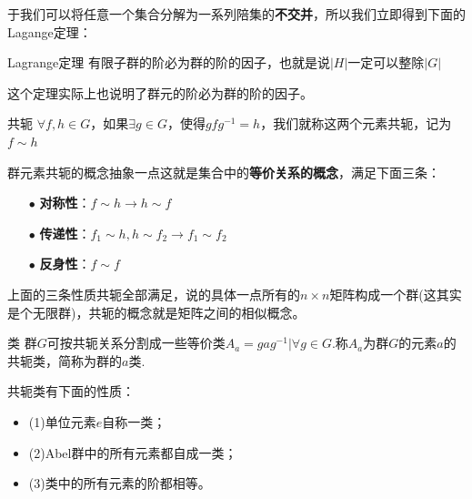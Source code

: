 于我们可以将任意一个集合分解为一系列陪集的\textbf{不交并}，所以我们立即得到下面的Lagange定理：
\begin{theorem}{Lagrange定理}
    有限子群的阶必为群的阶的因子，也就是说$|H|$一定可以整除$|G|$
\end{theorem}
这个定理实际上也说明了群元的阶必为群的阶的因子。
\begin{define}{共轭}
    $\forall f,h\in G$，如果$\exists g\in G$，使得$gfg^{-1}=h$，我们就称这两个元素共轭，记为$f\sim h$
\end{define}
群元素共轭的概念抽象一点这就是集合中的\textbf{等价关系的概念}，满足下面三条：
\begin{itemize}
    \item[$\bullet$] \textbf{对称性}：$f\sim h\rightarrow h\sim f$
    \item[$\bullet$] \textbf{传递性}：$f_1\sim h,h\sim f_2\rightarrow f_1\sim f_2$
    \item[$\bullet$] \textbf{反身性}：$f\sim f$
\end{itemize}
上面的三条性质共轭全部满足，说的具体一点所有的$n\times n$矩阵构成一个群(这其实是个无限群)，共轭的概念就是矩阵之间的相似概念。
\begin{define}{类}
    群$G$可按共轭关系分割成一些等价类$A_a={gag^{-1}|\forall g\in G}$.称$A_a$为群$G$的元素$a$的共轭类，简称为群的$a$类.
\end{define}
共轭类有下面的性质：
\begin{itemize}
    \item (1)单位元素$e$自称一类；
    \item (2)Abel群中的所有元素都自成一类；
    \item (3)类中的所有元素的阶都相等。
\end{itemize}

